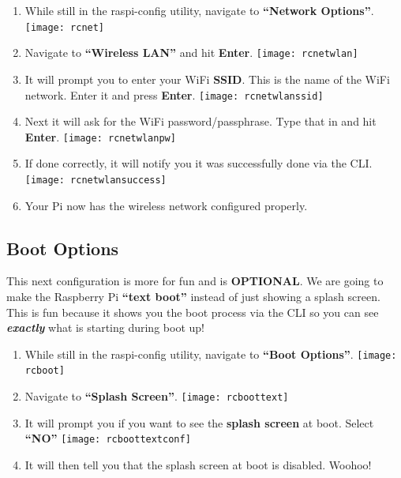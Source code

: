 \documentclass{article}
\begin{document}
\begin{enumerate}
  \item While still in the raspi-config utility, navigate to \textbf{``Network Options''}.
  \newline
  \newline
  \texttt{[image: rcnet]}
  \item Navigate to \textbf{``Wireless LAN''} and hit \textbf{Enter}.
  \newline
  \newline
  \texttt{[image: rcnetwlan]}
  \item It will prompt you to enter your WiFi \textbf{SSID}. This is the name of the WiFi network. Enter it and press \textbf{Enter}.
  \newline
  \newline
  \texttt{[image: rcnetwlanssid]}
  \item Next it will ask for the WiFi password/passphrase. Type that in and hit \textbf{Enter}.
  \newline
  \newline
  \texttt{[image: rcnetwlanpw]}
  \item If done correctly, it will notify you it was successfully done via the CLI.
  \newline
  \newline
  \texttt{[image: rcnetwlansuccess]}
  \item Your Pi now has the wireless network configured properly.
\end{enumerate}

\subsection{Boot Options}

This next configuration is more for fun and is \textbf{OPTIONAL}. We are going to make the Raspberry Pi \textbf{``text boot''} instead of just showing a splash screen. This is fun because it shows you the boot process via the CLI so you can see \textbf{\textit{exactly}} what is starting during boot up!

\begin{enumerate}
  \item While still in the raspi-config utility, navigate to \textbf{``Boot Options''}.
  \newline
  \newline
  \texttt{[image: rcboot]}
  \item Navigate to \textbf{``Splash Screen''}.
  \newline
  \newline
  \texttt{[image: rcboottext]}
  \item It will prompt you if you want to see the \textbf{splash screen} at boot. Select \textbf{``NO''}
  \newline
  \newline
  \texttt{[image: rcboottextconf]}
  \item It will then tell you that the splash screen at boot is disabled. Woohoo!
\end{enumerate}
\end{document}
